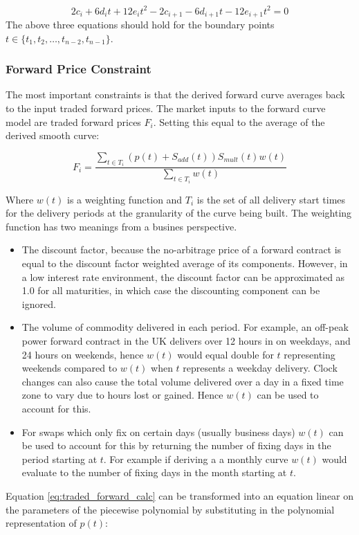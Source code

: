 \documentclass{article}
\begin{document}
\begin{equation}
    \label{eq:2nd_deriv_constraint}
    2 c_i + 6 d_i t + 12 e_i t^2 - 
    2 c_{i+1} - 6 d_{i+1} t - 12 e_{i+1} t^2 = 0
\end{equation}
The above three equations should hold for the boundary points \\
$t \in \{t_1, t_2, \hdots, t_{n-2}, t_{n-1}\}$.

\subsubsection{Forward Price Constraint}
The most important constraints is that the derived forward curve averages back to the 
input traded forward prices.
The market inputs to the forward curve model are traded forward prices $F_i$.
Setting this equal to the average of the derived smooth curve:

\begin{equation}
    \label{eq:traded_forward_calc}
    F_i = \frac{\sum_{t \in T_i} (p(t) + S_{add}(t))S_{mult}(t)w(t)}
    {\sum_{t \in T_i} w(t)}
\end{equation}

Where $w(t)$ is a weighting function and $T_i$ is the set of all delivery start times
for the delivery periods at the granularity of the curve being built. The weighting function has two
meanings from a busines perspective.
\begin{itemize}
    \item The discount factor, because the no-arbitrage price of a forward contract is equal 
    to the discount factor weighted average of its components. However, in a low interest rate 
    environment, the discount factor can be approximated as 1.0 for all maturities, in which case 
    the discounting component can be ignored.
    \item The volume of commodity delivered in each period. For example, an off-peak power forward 
    contract in the UK delivers over 12 hours in on weekdays, and 24 hours on weekends, hence $w(t)$ 
    would equal double for $t$ representing weekends compared to $w(t)$ when $t$ represents a weekday delivery. 
    Clock changes can also cause the total volume delivered over a day in a fixed time zone to vary 
    due to hours lost or gained. Hence $w(t)$ can be used to account for this.
    \item For swaps which only fix on certain days (usually business days) $w(t)$ can be used to account 
    for this by returning the number of fixing days in the period starting at $t$.
    For example if deriving a a monthly curve $w(t)$ would evaluate to the number of fixing days in the 
    month starting at $t$.
\end{itemize}
Equation \ref{eq:traded_forward_calc} can be transformed into an equation linear on the parameters of the piecewise polynomial by substituting
in the polynomial representation of $p(t)$:
\end{document}
